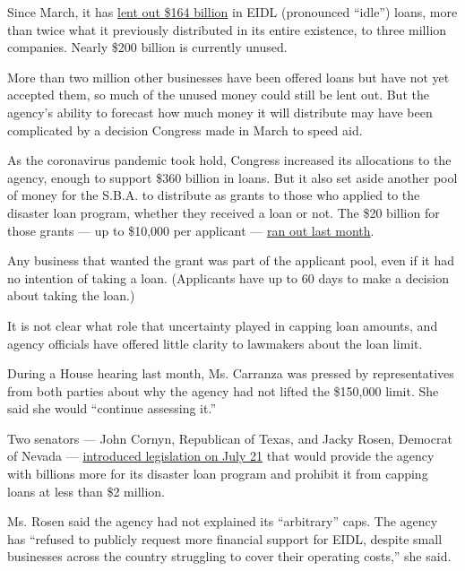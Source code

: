 Since March, it has
\href{https://www.sba.gov/sites/default/files/2020-07/EIDL\%20COVID-19\%20Loan\%207.27.20-508.pdf}{lent
out \$164 billion} in EIDL (pronounced ``idle'') loans, more than twice
what it previously distributed in its entire existence, to three million
companies. Nearly \$200 billion is currently unused.

More than two million other businesses have been offered loans but have
not yet accepted them, so much of the unused money could still be lent
out. But the agency's ability to forecast how much money it will
distribute may have been complicated by a decision Congress made in
March to speed aid.

As the coronavirus pandemic took hold, Congress increased its
allocations to the agency, enough to support \$360 billion in loans. But
it also set aside another pool of money for the S.B.A. to distribute as
grants to those who applied to the disaster loan program, whether they
received a loan or not. The \$20 billion for those grants --- up to
\$10,000 per applicant ---
\href{https://www.sba.gov/about-sba/sba-newsroom/press-releases-media-advisories/sba-provided-20-billion-small-businesses-and-non-profits-through-economic-injury-disaster-loan}{ran
out last month}.

Any business that wanted the grant was part of the applicant pool, even
if it had no intention of taking a loan. (Applicants have up to 60 days
to make a decision about taking the loan.)

It is not clear what role that uncertainty played in capping loan
amounts, and agency officials have offered little clarity to lawmakers
about the loan limit.

During a House hearing last month, Ms. Carranza was pressed by
representatives from both parties about why the agency had not lifted
the \$150,000 limit. She said she would ``continue assessing it.''

Two senators --- John Cornyn, Republican of Texas, and Jacky Rosen,
Democrat of Nevada ---
\href{https://www.cornyn.senate.gov/content/news/cornyn-introduces-bipartisan-legislation-provide-increased-eidl-loans-and-eidl-advance}{introduced
legislation on July 21} that would provide the agency with billions more
for its disaster loan program and prohibit it from capping loans at less
than \$2 million.

Ms. Rosen said the agency had not explained its ``arbitrary'' caps. The
agency has ``refused to publicly request more financial support for
EIDL, despite small businesses across the country struggling to cover
their operating costs,'' she said.

